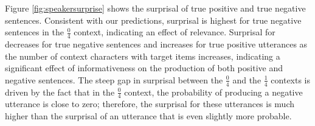 \documentclass[man, noapacite]{apa2}
\begin{document}



Figure \ref{fig:speakersurprise} shows the surprisal of true positive and true negative sentences.  Consistent with our predictions, surprisal is highest for true negative sentences in the $\frac{0}{4}$ context, indicating an effect of relevance. Surprisal for decreases for true negative sentences and increases for true positive utterances as the number of context characters with target items increases, indicating a significant effect of informativeness on the production of both positive and negative sentences. The steep gap in surprisal between the  $\frac{0}{4}$ and the $\frac{1}{4}$ contexts is driven by the fact that in the  $\frac{0}{4}$ context, the probability of producing a negative utterance is close to zero; therefore, the surprisal for these utterances is much higher than the surprisal of an utterance that is even slightly more probable. 
\end{document}
